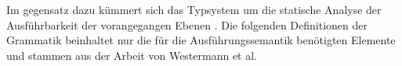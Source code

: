     Im gegensatz dazu kümmert sich das Typsystem um die statische Analyse der Ausführbarkeit der vorangegangen Ebenen \cite{99}.
    Die folgenden Definitionen der Grammatik beinhaltet nur die für die Ausführungssemantik benötigten Elemente \cite{99} und stammen aus der Arbeit von Westermann et al.
